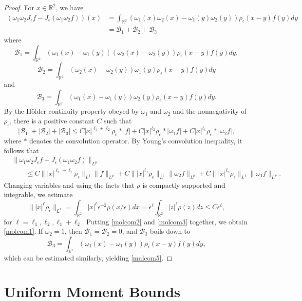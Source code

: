 \documentclass[12pt,reqno]{amsart}
\newcommand{\be}{\begin{equation}}
\newcommand{\ee}{\end{equation}}
\newcommand{\R}{\mathbb R}
\begin{document}
\begin{proof}
For $x \in \R^2$, we have 
\be 
\begin{aligned}
(\omega_1 \omega_2 J_{\epsilon}f - J_{\epsilon}(\omega_1 \omega_2 f))(x)
&= \int_{\R^2} (\omega_1(x) \omega_2(x) - \omega_1(y) \omega_2(y)) \rho_{\epsilon}(x-y) f(y) dy 
\\&= \mathcal{B}_1 + \mathcal{B}_2 + \mathcal{B}_3
\end{aligned}
\ee where 
\be 
\mathcal{B}_1 = \int_{\R^2} (\omega_1(x) - \omega_1(y)) (\omega_2(x) - \omega_2(y)) \rho_{\epsilon}(x-y) f(y) dy, 
\ee 
\be 
\mathcal{B}_2 = \int_{\R^2} (\omega_2(x)- \omega_2(y)) \omega_1(y) \rho_{\epsilon}(x-y) f(y) dy 
\ee and 
\be 
\mathcal{B}_3 = \int_{\R^2} (\omega_1(x)- \omega_1(y)) \omega_2(y) \rho_{\epsilon}(x-y) f(y) dy. 
\ee By the H\"older continuity property obeyed by $\omega_1$ and $\omega_2$ and the nonnegativity of $\rho_{\epsilon}$, there is a positive constant $C$ such that 
\be 
|\mathcal{B}_1| + |\mathcal{B}_2| + |\mathcal{B}_3|
\le C |x|^{\ell_1 + \ell_2} \rho_{\epsilon} * |f| + C|x|^{\ell_2}\rho_{\epsilon} * |\omega_1 f| + C|x|^{\ell_1}\rho_{\epsilon} * |\omega_2f|,
\ee where $*$ denotes the convolution operator. By Young's convolution inequality, it follows that 
\be \label{molcom2}
\begin{aligned}
&\|\omega_1 \omega_2 J_{\epsilon}f - J_{\epsilon}(\omega_1 \omega_2 f)\|_{L^p}
\\&\quad\quad\le C\||x|^{\ell_1+ \ell_2} \rho_{\epsilon}\|_{L^1} \|f\|_{L^p}
+ C\||x|^{\ell_1} \rho_{\epsilon}\|_{L^1} \|\omega_2 f\|_{L^p}
+ 
 C\||x|^{\ell_2} \rho_{\epsilon}\|_{L^1} \|\omega_1 f\|_{L^p}.
 \end{aligned}
\ee Changing variables and using the facts that $\rho$ is compactly supported and integrable, we estimate 
\be \label{molcom3}
\||x|^{\ell} \rho_{\epsilon}\|_{L^1}
= \int_{\R^2} |x|^{\ell} \epsilon^{{-2}}\rho(x/\epsilon) dx
= \epsilon^{\ell} \int_{\R^2} |z|^{\ell} \rho(z) dz \le C\epsilon^{\ell},
\ee for $\ell = \ell_1, \ell_2, \ell_1 + \ell_2$. Putting \eqref{molcom2} and \eqref{molcom3} together, we obtain \eqref{molcom1}. If $\omega_2 = 1$, then $\mathcal{B}_1 = \mathcal{B}_2 = 0$, and $\mathcal{B}_3$ boils down to 
\be 
\mathcal{B}_3 = \int_{\R^2} (\omega_1(x) - \omega_1(y)) \rho_{\epsilon}(x-y) f(y) dy,
\ee which can be estimated similarly, yielding \eqref{malcom5}. 
\end{proof}

\section{Uniform Moment Bounds} \label{s3}
\end{document}
